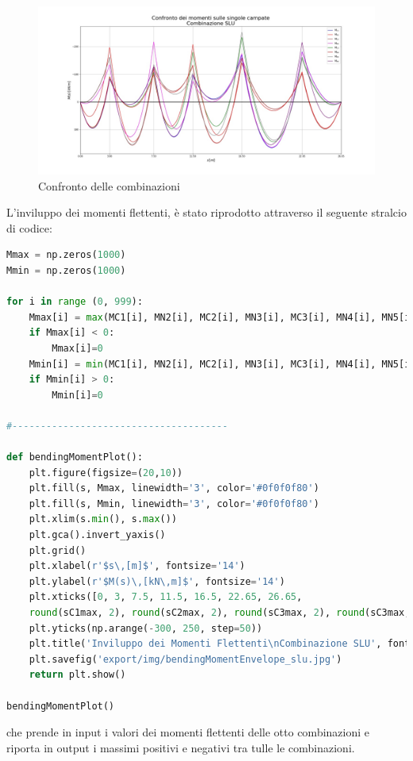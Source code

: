  \begin{figure}
 	\centering
 	\includegraphics[width=\textwidth]{../../export/img/bendingMomentComparison_slu}
 	\caption{Confronto delle combinazioni}
 	\label{fig:bendingMomentComparison_slu}
 \end{figure}
 
 L'inviluppo dei momenti flettenti, è stato riprodotto attraverso il seguente stralcio di codice:
 
 \begin{lstlisting}[language=Python]
Mmax = np.zeros(1000)
Mmin = np.zeros(1000)

for i in range (0, 999):
    Mmax[i] = max(MC1[i], MN2[i], MC2[i], MN3[i], MC3[i], MN4[i], MN5[i], MN6[i])
    if Mmax[i] < 0:
        Mmax[i]=0
    Mmin[i] = min(MC1[i], MN2[i], MC2[i], MN3[i], MC3[i], MN4[i], MN5[i], MN6[i])
    if Mmin[i] > 0:
        Mmin[i]=0

#--------------------------------------

def bendingMomentPlot():
    plt.figure(figsize=(20,10))
    plt.fill(s, Mmax, linewidth='3', color='#0f0f0f80')
    plt.fill(s, Mmin, linewidth='3', color='#0f0f0f80')
    plt.xlim(s.min(), s.max())
    plt.gca().invert_yaxis()
    plt.grid()
    plt.xlabel(r'$s\,[m]$', fontsize='14')
    plt.ylabel(r'$M(s)\,[kN\,m]$', fontsize='14')
    plt.xticks([0, 3, 7.5, 11.5, 16.5, 22.65, 26.65,
    round(sC1max, 2), round(sC2max, 2), round(sC3max, 2), round(sC3max, 2), round(sC4max, 2), round(sC5max, 2), round(sC6max, 2)])
    plt.yticks(np.arange(-300, 250, step=50))
    plt.title('Inviluppo dei Momenti Flettenti\nCombinazione SLU', fontsize='22')
    plt.savefig('export/img/bendingMomentEnvelope_slu.jpg')
    return plt.show()

bendingMomentPlot()
 \end{lstlisting}
 che prende in input i valori dei momenti flettenti delle otto combinazioni e riporta in output i massimi positivi e negativi tra tulle le combinazioni.
 
